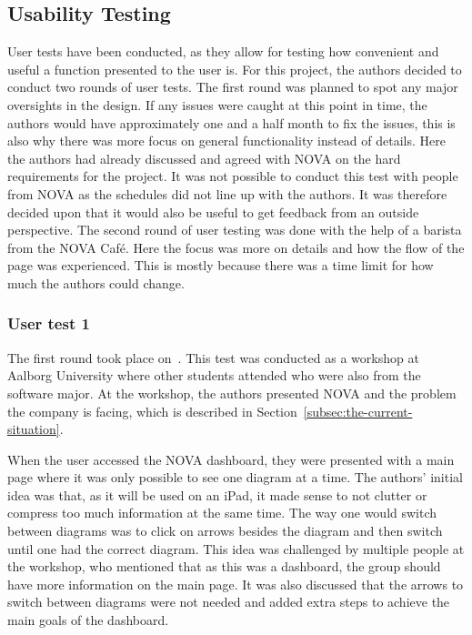 \subsection{Usability Testing}\label{subsec:usability-tests}

User tests have been conducted, as they allow for testing how convenient and useful a function presented to the user is.
For this project, the authors decided to conduct two rounds of user tests.
The first round was planned to spot any major oversights in the design.
If any issues were caught at this point in time, the authors would have approximately one and a half month
to fix the issues, this is also why there was more focus on general functionality instead of details.
Here the authors had already discussed and agreed with NOVA on the hard requirements for the project.
It was not possible to conduct this test with people from NOVA as the schedules did not line up with the authors.
It was therefore decided upon that it would also be useful to get feedback from an outside perspective.
The second round of user testing was done with the help of a barista from the NOVA Café.
Here the focus was more on details and how the flow of the page was experienced.
This is mostly because there was a time limit for how much the authors could change.

\subsubsection{User test 1}\label{subsubsec:user-test-1}

The first round took place on~.
This test was conducted as a workshop at Aalborg University where other students attended who were also from the
software major.
At the workshop, the authors presented NOVA and the problem the company is facing, which is described in
Section~\ref{subsec:the-current-situation}.

When the user accessed the NOVA dashboard, they were presented with a main page where it was only possible to see
one diagram at a time.
The authors' initial idea was that, as it will be used on an iPad, it made sense to not clutter or compress too
much information at the same time.
The way one would switch between diagrams was to click on arrows besides the diagram and then switch until one had
the correct diagram.
This idea was challenged by multiple people at the workshop, who mentioned that as this was a dashboard, the group
should have more information on the main page.
It was also discussed that the arrows to switch between diagrams were not needed and added extra steps to achieve
the main goals of the dashboard.

